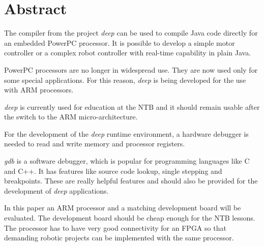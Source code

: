 
\chapter*{Abstract}


The compiler from the project \textit{deep} can be used to compile Java code directly for an embedded PowerPC processor.
It is possible to develop a simple motor controller or a complex robot controller with real-time capability in plain Java.


PowerPC processors are no longer in widespread use.
They are now used only for some special applications.
For this reason, \textit{deep} is being developed for the use with ARM processors.

\textit{deep} is currently used for education at the NTB and it should remain usable after the switch to the ARM micro-architecture.

For the development of the \textit{deep} runtime environment, a hardware debugger is needed to read and write memory and processor registers.

\textit{gdb} is a software debugger, which is popular for programming languages like C and C++.
It has features like source code lookup, single stepping and breakpoints.
These are really helpful features and should also be provided for the development of \textit{deep} applications.

In this paper an ARM processor and a matching development board will be evaluated.
The development board should be cheap enough for the NTB lessons.
The processor has to have very good connectivity for an FPGA so that demanding robotic projects can be implemented with the same processor.

